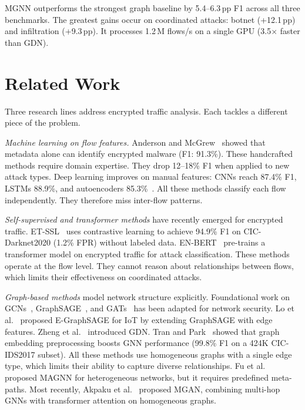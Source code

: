 \documentclass[conference]{IEEEtran}
\begin{document}
MGNN outperforms the strongest graph baseline by 5.4--6.3\,pp F1 across all three benchmarks. The greatest gains occur on coordinated attacks: botnet (+12.1\,pp) and infiltration (+9.3\,pp). It processes 1.2\,M flows/s on a single GPU (3.5$\times$ faster than GDN).


\section{Related Work}
\label{sec:related}

Three research lines address encrypted traffic analysis. Each tackles a different piece of the problem.

\textit{Machine learning on flow features.} Anderson and McGrew~\cite{anderson2016identifying} showed that metadata alone can identify encrypted malware (F1: 91.3\%). These handcrafted methods require domain expertise. They drop 12--18\% F1 when applied to new attack types. Deep learning improves on manual features: CNNs reach 87.4\% F1, LSTMs 88.9\%, and autoencoders 85.3\%~\cite{mirsky2018kitsune}. All these methods classify each flow independently. They therefore miss inter-flow patterns.

\textit{Self-supervised and transformer methods} have recently emerged for encrypted traffic. ET-SSL~\cite{sattar2025etssl} uses contrastive learning to achieve 94.9\% F1 on CIC-Darknet2020 (1.2\% FPR) without labeled data. EN-BERT~\cite{liu2025enbert} pre-trains a transformer model on encrypted traffic for attack classification. These methods operate at the flow level. They cannot reason about relationships between flows, which limits their effectiveness on coordinated attacks.

\textit{Graph-based methods} model network structure explicitly. Foundational work on GCNs~\cite{kipf2017semi}, GraphSAGE~\cite{hamilton2017inductive}, and GATs~\cite{velivckovic2018graph} has been adapted for network security. Lo et al.~\cite{lo2021egraphsage} proposed E-GraphSAGE for IoT by extending GraphSAGE with edge features. Zheng et al.~\cite{zheng2022gdn} introduced GDN. Tran and Park~\cite{tran2024fngnn} showed that graph embedding preprocessing boosts GNN performance (99.8\% F1 on a 424K CIC-IDS2017 subset). All these methods use homogeneous graphs with a single edge type, which limits their ability to capture diverse relationships. Fu et al.~\cite{zhang2021magnn} proposed MAGNN for heterogeneous networks, but it requires predefined meta-paths. Most recently, Akpaku et al.~\cite{akpaku2025mgan} proposed MGAN, combining multi-hop GNNs with transformer attention on homogeneous graphs.
\end{document}
